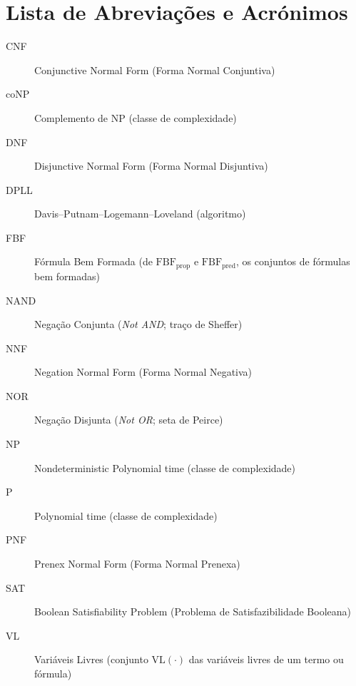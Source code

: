 \documentclass[12pt,a4paper,oneside]{report}
\theoremstyle{tituloplain}
\theoremstyle{titulodef}
\begin{document}
\listoftables
\clearpage

\listoffigures
\clearpage

\chapter*{Lista de Abreviações e Acrónimos}
\begin{description}
  \item[CNF] Conjunctive Normal Form (Forma Normal Conjuntiva)
  \item[coNP] Complemento de NP (classe de complexidade)
  \item[DNF] Disjunctive Normal Form (Forma Normal Disjuntiva)
  \item[DPLL] Davis--Putnam--Logemann--Loveland (algoritmo)
  \item[FBF] Fórmula Bem Formada (de $\mathrm{FBF}_{\mathrm{prop}}$ e $\mathrm{FBF}_{\mathrm{pred}}$, os conjuntos de fórmulas bem formadas)
  \item[NAND] Negação Conjunta (\textit{Not AND}; traço de Sheffer)
  \item[NNF] Negation Normal Form (Forma Normal Negativa)
  \item[NOR] Negação Disjunta (\textit{Not OR}; seta de Peirce)
  \item[NP] Nondeterministic Polynomial time (classe de complexidade)
  \item[P] Polynomial time (classe de complexidade)
  \item[PNF] Prenex Normal Form (Forma Normal Prenexa)
  \item[SAT] Boolean Satisfiability Problem (Problema de Satisfazibilidade Booleana)
  \item[VL] Variáveis Livres (conjunto $\mathrm{VL}(\cdot)$ das variáveis livres de um termo ou fórmula)
\end{description}
\clearpage

\setcounter{page}{27} %

\end{document}
